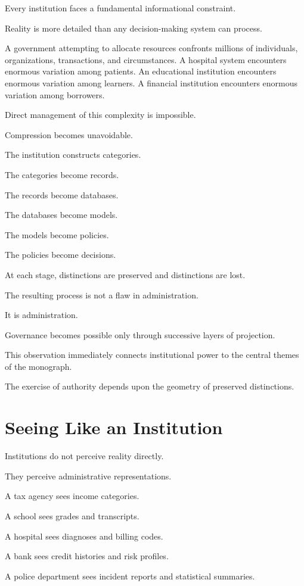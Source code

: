 \documentclass[11pt,oneside,openany]{book}
\begin{document}
Every institution faces a fundamental informational constraint.

Reality is more detailed than any decision-making system can process.

A government attempting to allocate resources confronts millions of individuals, organizations, transactions, and circumstances. A hospital system encounters enormous variation among patients. An educational institution encounters enormous variation among learners. A financial institution encounters enormous variation among borrowers.

Direct management of this complexity is impossible.

Compression becomes unavoidable.

The institution constructs categories.

The categories become records.

The records become databases.

The databases become models.

The models become policies.

The policies become decisions.

At each stage, distinctions are preserved and distinctions are lost.

The resulting process is not a flaw in administration.

It is administration.

Governance becomes possible only through successive layers of projection.

This observation immediately connects institutional power to the central themes of the monograph.

The exercise of authority depends upon the geometry of preserved distinctions.

\section{Seeing Like an Institution}

Institutions do not perceive reality directly.

They perceive administrative representations.

A tax agency sees income categories.

A school sees grades and transcripts.

A hospital sees diagnoses and billing codes.

A bank sees credit histories and risk profiles.

A police department sees incident reports and statistical summaries.
\end{document}
